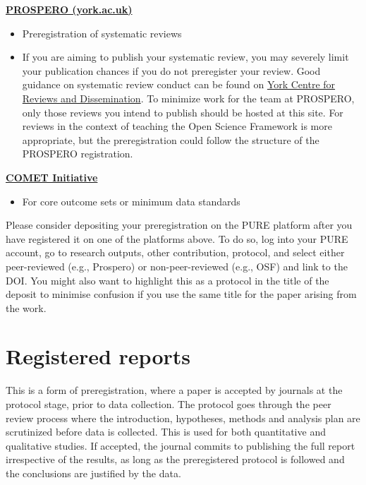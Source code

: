 \documentclass[
  letterpaper,
  DIV=11,
  numbers=noendperiod]{scrreprt}
\providecommand{\tightlist}{%
  \setlength{\itemsep}{0pt}\setlength{\parskip}{0pt}}\usepackage{longtable,booktabs,array}
\begin{document}
\href{https://www.crd.york.ac.uk/prospero/}{\textbf{PROSPERO
(york.ac.uk)}}~

\begin{itemize}
\tightlist
\item
  Preregistration of systematic reviews~
\end{itemize}

\begin{itemize}
\tightlist
\item
  If you are aiming to publish your systematic review, you may severely
  limit your publication chances if you do not preregister your review.
  Good guidance on systematic review conduct can be found on
  \href{https://www.york.ac.uk/media/crd/Systematic_Reviews.pdf}{York
  Centre for Reviews and Dissemination}. To minimize work for the team
  at PROSPERO, only those reviews you intend to publish should be hosted
  at this site. For reviews in the context of teaching the Open Science
  Framework is more appropriate, but the preregistration could follow
  the structure of the PROSPERO registration.~~
\end{itemize}

\href{https://www.comet-initiative.org/}{\textbf{COMET Initiative}}~

\begin{itemize}
\tightlist
\item
  For core outcome sets or minimum data standards~
\end{itemize}

Please consider depositing your preregistration on the PURE platform
after you have registered it on one of the platforms above. To do so,
log into your PURE account, go to research outputs, other contribution,
protocol, and select either peer-reviewed (e.g., Prospero) or
non-peer-reviewed (e.g., OSF) and link to the DOI. You might also want
to highlight this as a protocol in the title of the deposit to minimise
confusion if you use the same title for the paper arising from the
work.~

\hypertarget{registered-reports}{%
\section{Registered reports~}\label{registered-reports}}

This is a form of preregistration, where a paper is accepted by journals
at the protocol stage, prior to data collection. The protocol goes
through the peer review process where the introduction, hypotheses,
methods and analysis plan are scrutinized before data is collected. This
is used for both quantitative and qualitative studies. If accepted, the
journal commits to publishing the full report irrespective of the
results, as long as the preregistered protocol is followed and the
conclusions are justified by the data.~
\end{document}
